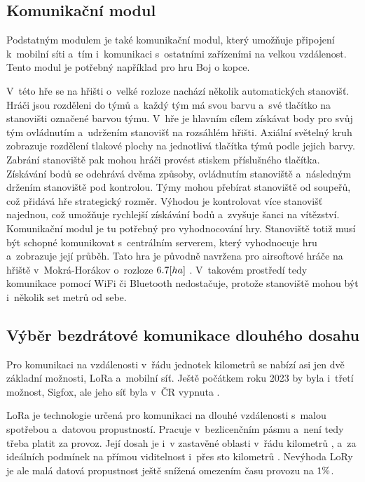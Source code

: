 \subsection{Komunikační modul \label{sec:KomunikacniModul}}
Podstatným modulem je také komunikační modul, který umožňuje připojení k~mobilní síti a~tím i~komunikaci s~ostatními zařízeními na velkou vzdálenost.
Tento modul je potřebný například pro hru Boj o kopce.

V~této hře se na hřišti o~velké rozloze nachází několik automatických stanovišť.
Hráči jsou rozděleni do týmů a~každý tým má svou barvu a~své tlačítko na stanovišti označené barvou týmu.
V~hře je hlavním cílem získávat body pro svůj tým ovládnutím a~udržením stanovišť na rozsáhlém hřišti. 
Axiální světelný kruh zobrazuje rozdělení tlakové plochy na jednotlivá tlačítka týmů podle jejich barvy.
Zabrání stanoviště pak mohou hráči provést stiskem příslušného tlačítka. 
Získávání bodů se odehrává dvěma způsoby, ovládnutím stanoviště a~následným držením stanoviště pod kontrolou. 
Týmy mohou přebírat stanoviště od soupeřů, což přidává hře strategický rozměr. 
Výhodou je kontrolovat více stanovišť najednou, což umožňuje rychlejší získávání bodů a~zvyšuje šanci na vítězství.
Komunikační modul je tu potřebný pro vyhodnocování hry.
Stanoviště totiž musí být schopné komunikovat s~centrálním serverem, který vyhodnocuje hru a~zobrazuje její průběh.
Tato hra je původně navržena pro airsoftové hráče na hřiště v~Mokrá-Horákov o~rozloze \(6.7\-[ha]\) \cite{MokraHorakov}.
V~takovém prostředí tedy komunikace pomocí WiFi či Bluetooth nedostačuje, protože stanoviště mohou být i~několik set metrů od sebe.

\subsection{Výběr bezdrátové komunikace dlouhého dosahu \label{sec:TypVzdaleneKomunikace}}
Pro komunikaci na vzdálenosti v~řádu jednotek kilometrů se nabízí asi jen dvě základní možnosti, LoRa a~mobilní síť.
Ještě počátkem roku 2023 by byla i~třetí možnost, Sigfox, ale jeho síť byla v~ČR vypnuta \cite{SigfoxKonci}.

LoRa je technologie určená pro komunikaci na dlouhé vzdálenosti s~malou spotřebou a~datovou propustností.
Pracuje v~bezlicenčním pásmu a~není tedy třeba platit za provoz.
Její dosah je i~v zastavěné oblasti v~řádu kilometrů \cite{LoRaSEMTECH}, a~za ideálních podmínek na přímou viditelnost i~přes sto kilometrů \cite{LoRaEMAN}. 
Nevýhoda LoRy je ale malá datová propustnost ještě snížená omezením času provozu na \(1\-\%\)\cite{LoRaEMAN}.

